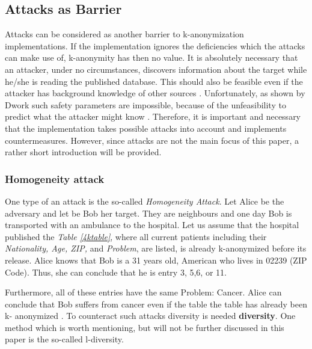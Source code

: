 \documentclass{llncs}
\begin{document}
\subsection{Attacks as Barrier}

Attacks can be considered as another barrier to k-anonymization implementations. If the implementation ignores the deficiencies which the attacks can make use of, k-anonymity has then no value. It is absolutely necessary that an attacker, under no circumstances, discovers information about the target while he/she is reading the published database. This should also be feasible even if the attacker has background knowledge of other sources   \cite{Dalenius1977}. Unfortunately, as shown by Dwork such safety parameters are impossible, because of the unfeasibility to predict what the attacker might know \cite{dwork2011differential}. Therefore, it is important and necessary that the implementation takes possible attacks into account and implements countermeasures. However, since attacks are not the main focus of this paper, a rather short introduction will be provided. 

\subsubsection{Homogeneity attack}

One type of an attack is the so-called \textit{Homogeneity Attack}. Let Alice be the adversary and let be Bob her target. They are neighbours and one day Bob is transported with an ambulance to the hospital. Let us assume that the hospital published the \textit{Table \ref{4ktable}}, where all current patients including their \textit{Nationality, Age, ZIP,} and \textit{Problem}, are listed, is already k-anonymized before its release. Alice knows that Bob is a 31 years old, American who lives in 02239 (ZIP Code). Thus, she can conclude that he is entry 3, 5,6, or 11.

Furthermore, all of these entries have the same Problem: Cancer. Alice can conclude that Bob suffers from cancer even if the table the table has already been k- anonymized  \cite{sweeney2002k,ldiversity}. To counteract such attacks diversity is needed \textbf{diversity}. One method which is worth mentioning, but will not be further discussed in this paper is the so-called l-diversity.  
\end{document}
